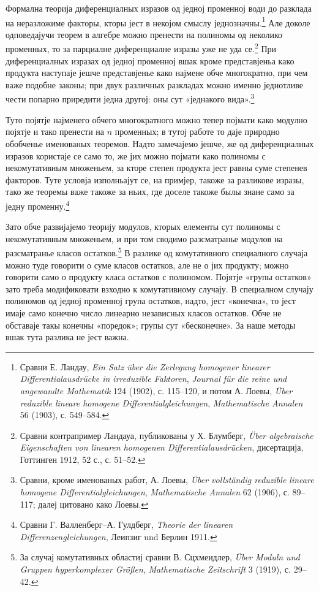 ﻿\documentclass[11pt]{article}
\begin{document}
Формална теорија диференциалных изразов од једној променној води до разклада на неразложиме факторы, кторы јест в некојом смыслу једнозначны.\footnote{Сравни Е. Ландау, \emph{Ein Satz über die Zerlegung homogener linearer Differentialausdrücke in irreduzible Faktoren}, \emph{Journal für die reine und angewandte Mathematik} 124 (1902), с. 115--120, и потом А. Лоевы, \emph{Über reduzible lineare homogene Differentialgleichungen}, \emph{Mathematische Annalen} 56 (1903), с. 549--584.} Але доколе одповедајучи теорем в алгебре можно пренести на полиномы од неколико променных, то за парциалне диференциалне изразы уже не уда се.\footnote{Сравни контрапример Ландауа, публикованы у Х. Блумберг, \emph{Über algebraische Eigenschaften von linearen homogenen Differentialausdrücken}, дисертација, Готтинген 1912, 52 с., с. 51--52.} При диференциалных изразах од једној променној вшак кроме представјеньа како продукта наступаје јешче представјенье како најмене обче многократно, при чем важе подобне законы; при двух различных разкладах можно именно једнотливе чести попарно приредити једна другој: оны сут «једнакого вида».\footnote{Сравни, кроме именованых работ, А. Лоевы, \emph{Über vollständig reduzible lineare homogene Differentialgleichungen}, \emph{Mathematische Annalen} 62 (1906), с. 89--117; далеј цитовано како Лоевы.}

Туто појятје најменего обчего многократного можно тепер појмати како модулно појятје и тако пренести на \(n\) променных; в тутој работе то даје природно обобченье именованых теоремов. Надто замечајемо јешче, же од диференциалных изразов користаје се само то, же јих можно појмати како полиномы с некомутативным множеньем, за кторе степен продукта јест равны суме степенев факторов. Туте условја изполньајут се, на примјер, такоже за разликове изразы, тако же теоремы важе такоже за ньих, где доселе такоже былы знане само за једну променну.\footnote{Сравни Г. Валленберг--А. Гулдберг, \emph{Theorie der linearen Differenzengleichungen}, Леипзиг und Берлин 1911.}

Зато обче развијајемо теорију модулов, кторых елементы сут полиномы с некомутативным множеньем, и при том сводимо разсматранье модулов на разсматранье класов остатков.\footnote{За случај комутативных областиј сравни В. Сцхмеидлер, \emph{Über Moduln und Gruppen hyperkomplexer Größen}, \emph{Mathematische Zeitschrift} 3 (1919), с. 29--42.} В разлике од комутативного специалного случаја можно туде говорити о суме класов остатков, але не о јих продукту; можно говорити само о продукту класа остатков с полиномом. Појятје «групы остатков» зато треба модификовати взходно к комутативному случају. В специалном случају полиномов од једној променној група остатков, надто, јест «конечна», то јест имаје само конечно число линеарно независных класов остатков. Обче не обставаје такы конечны «поредок»; групы сут «бесконечне». За наше методы вшак тута разлика не јест важна.
\end{document}
